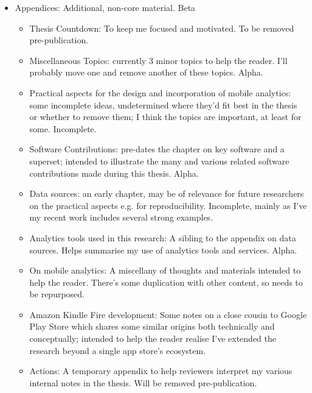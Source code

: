 \begin{itemize}
    \item Appendices: Additional, non-core material. Beta
    \begin{itemize}
        \item Thesis Countdown: To keep me focused and motivated. To be removed pre-publication.
        \item Miscellaneous Topics: currently 3 minor topics to help the reader. I'll probably move one and remove another of these topics. Alpha.
        \item Practical aspects for the design and incorporation of mobile analytics: some incomplete ideas, undetermined where they'd fit best in the thesis or whether to remove them; I think the topics are important, at least for some. Incomplete.
        \item Software Contributions: pre-dates the chapter on key software and a superset; intended to illustrate the many and various related software contributions made during this thesis. Alpha.
        \item Data sources: an early chapter, may be of relevance for future researchers on the practical aspects e.g. for reproducibility. Incomplete, mainly as I've my recent work includes several strong examples.
        \item Analytics tools used in this research: A sibling to the appendix on data sources. Helps summarise my use of analytics tools and services. Alpha.
        \item On mobile analytics: A miscellany of thoughts and materials intended to help the reader. There's some duplication with other content, so needs to be repurposed.
        \item Amazon Kindle Fire development: Some notes on a close cousin to Google Play Store which shares some similar origins both technically and conceptually; intended to help the reader realise I've extended the research beyond a single app store's ecosystem.
        \item Actions: A temporary appendix to help reviewers interpret my various internal notes in the thesis. Will be removed pre-publication.
    \end{itemize}
    
\end{itemize}

